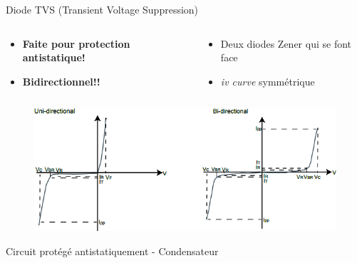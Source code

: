\begin{frame}{Diode TVS (Transient Voltage Suppression)}
    \begin{columns}
        \begin{column}{0.5\textwidth}
            \begin{itemize}
                \item \textbf{Faite pour protection antistatique!}
                \item \textbf{Bidirectionnel!!}
            \end{itemize}
        \end{column}
        \begin{column}{0.5\textwidth}
            \begin{itemize}
                \item Deux diodes Zener qui se font face
                \item \textit{iv curve} symmétrique
            \end{itemize}
        \end{column}
    \end{columns}
    \begin{figure}
        \centering
        \includegraphics[width=\textwidth, height=0.55\textheight, keepaspectratio]{pictures/diode-tvs-iv-curve.png}
    \end{figure}
\end{frame}

\begin{frame}{Circuit protégé antistatiquement - Condensateur}
    \begin{center}
    \vspace{-24pt}
    \end{center}
\end{frame}


